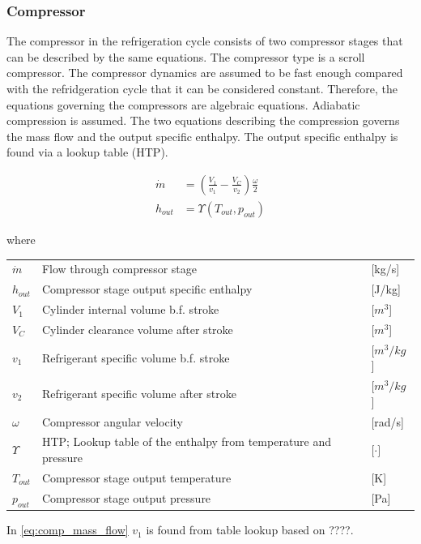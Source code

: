 \subsubsection{Compressor}
The compressor in the refrigeration cycle consists of two compressor stages that can be described by the same equations. The compressor type is a scroll compressor.
The compressor dynamics are assumed to be fast enough compared with the refridgeration cycle that it can be considered constant. Therefore, the equations governing the compressors are algebraic equations. 
Adiabatic compression is assumed. 
The two equations describing the compression governs the mass flow and the output specific enthalpy. The output specific enthalpy is found via a lookup table (HTP). 

\begin{align}
	\dot{m} &= \left(\frac{V_1}{v_1} - \frac{V_C}{v_2}\right) \frac{\omega}{2} \\ \label{eq:comp_mass_flow}
	h_{out} &= \Upsilon(T_{out}, p_{out}) 
\end{align}

where

\begin{center}
	\begin{tabular}{l p{8cm} l}
		$\dot{m}$				& Flow through compressor stage					& [\si{kg}/\si{s}] \\ 
		$h_{out}$				& Compressor stage output specific enthalpy				& [\si{J}/\si{kg}] \\ 
		$V_1$					& Cylinder internal volume b.f. stroke			& [$\si{m}^3$] \\ 
		$V_C$					& Cylinder clearance volume after stroke		& [$\si{m}^3$] \\ 
		$v_1$					& Refrigerant specific volume b.f. stroke		& [$\si{m}^3/\si{kg}$] \\
		$v_2$					& Refrigerant specific volume after stroke		& [$\si{m}^3/\si{kg}$] \\
		$\omega$ 				& Compressor angular velocity 					& [\si{rad}/\si{s}]\\
		$\Upsilon$ 				& HTP; Lookup table of the enthalpy from temperature and pressure 			& [$\cdot]$ \\
		$T_{out}$ 				& Compressor stage output temperature 			& [\si{K}] \\
		$p_{out}$				& Compressor stage output pressure 				& [\si{Pa}]
	\end{tabular}
\end{center}

In \cref{eq:comp_mass_flow} $v_1$ is found from table lookup based on ????.


